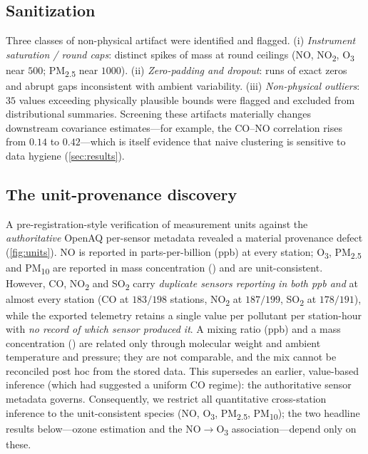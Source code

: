 \subsection{Sanitization}
Three classes of non-physical artifact were identified and flagged. (i) \emph{Instrument
saturation / round caps}: distinct spikes of mass at round ceilings
(NO, NO\textsubscript{2}, O\textsubscript{3} near $500$; PM\textsubscript{2.5} near
$1000$). (ii) \emph{Zero-padding and dropout}: runs of exact zeros and abrupt gaps
inconsistent with ambient variability. (iii) \emph{Non-physical outliers}: $35$ values
exceeding physically plausible bounds were flagged and excluded from distributional
summaries. Screening these artifacts materially changes downstream covariance
estimates---for example, the CO--NO correlation rises from $0.14$ to $0.42$---which is
itself evidence that naive clustering is sensitive to data hygiene (\cref{sec:results}).

\subsection{The unit-provenance discovery}
\label{sec:units}
A pre-registration-style verification of measurement units against the
\emph{authoritative} OpenAQ per-sensor metadata revealed a material provenance defect
(\cref{fig:units}). NO is reported in parts-per-billion (ppb) at every station;
O\textsubscript{3}, PM\textsubscript{2.5} and PM\textsubscript{10} are reported in
mass concentration (\ugm{}) and are unit-consistent. However, CO, NO\textsubscript{2}
and SO\textsubscript{2} carry \emph{duplicate sensors reporting in both ppb and \ugm{}}
at almost every station (CO at $183/198$ stations, NO\textsubscript{2} at $187/199$,
SO\textsubscript{2} at $178/191$), while the exported telemetry retains a single value
per pollutant per station-hour with \emph{no record of which sensor produced it}. A
mixing ratio (ppb) and a mass concentration (\ugm{}) are related only through molecular
weight and ambient temperature and pressure; they are not comparable, and the mix
cannot be reconciled post hoc from the stored data. This supersedes an earlier,
value-based inference (which had suggested a uniform CO regime): the authoritative
sensor metadata governs. Consequently, we restrict all quantitative cross-station
inference to the unit-consistent species (NO, O\textsubscript{3},
PM\textsubscript{2.5}, PM\textsubscript{10}); the two headline results below---ozone
estimation and the NO$\rightarrow$O\textsubscript{3} association---depend only on these.

